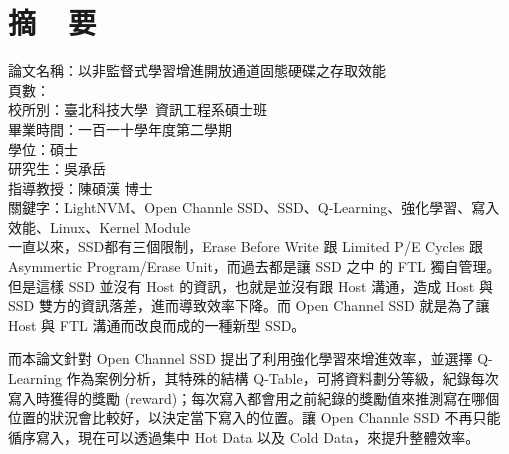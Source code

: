 \chapter*{摘~~要}


\noindent
論文名稱：以非監督式學習增進開放通道固態硬碟之存取效能 \\%
頁數：\\
校所別：臺北科技大學~資訊工程系碩士班\\
畢業時間：一百一十學年度第二學期\\
學位：碩士\\
研究生：吳承岳\\
指導教授：陳碩漢 博士\\
\noindent
關鍵字：LightNVM、Open Channle SSD、SSD、Q-Learning、強化學習、寫入效能、Linux、Kernel Module\\
%
\indent
一直以來，SSD都有三個限制，Erase Before Write 跟 Limited P/E Cycles 跟 Asymmertic Program/Erase Unit，而過去都是讓 SSD 之中 的 FTL 獨自管理。但是這樣 SSD 並沒有 Host 的資訊，也就是並沒有跟 Host 溝通，造成 Host 與 SSD 雙方的資訊落差，進而導致效率下降。而 Open Channel SSD 就是為了讓 Host 與 FTL 溝通而改良而成的一種新型 SSD。

\indent
而本論文針對 Open Channel SSD 提出了利用強化學習來增進效率，並選擇 Q-Learning 作為案例分析，其特殊的結構 Q-Table，可將資料劃分等級，紀錄每次寫入時獲得的獎勵 (reward)；每次寫入都會用之前紀錄的獎勵值來推測寫在哪個位置的狀況會比較好，以決定當下寫入的位置。讓 Open Channle SSD 不再只能循序寫入，現在可以透過集中 Hot Data 以及 Cold Data，來提升整體效率。


